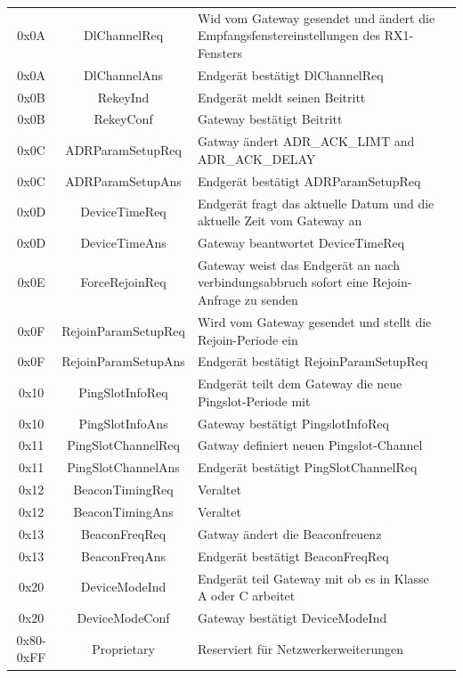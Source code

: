 \documentclass[a4paper, 12pt]{article}
\begin{document}
\begin{longtable}{c |c | p{10.5cm} c}
                    0x0A & DlChannelReq & Wid vom Gateway gesendet und ändert die Empfangsfenstereinstellungen des RX1-Fensters \\
                    0x0A & DlChannelAns & Endgerät bestätigt DlChannelReq \\
                    0x0B & RekeyInd & Endgerät meldt seinen Beitritt \\
                    0x0B & RekeyConf & Gateway bestätigt Beitritt \\
                    0x0C & ADRParamSetupReq & Gatway ändert ADR\_ACK\_LIMT and ADR\_ACK\_DELAY \\
                    0x0C & ADRParamSetupAns & Endgerät bestätigt ADRParamSetupReq \\
                    0x0D & DeviceTimeReq & Endgerät fragt das aktuelle Datum und die aktuelle Zeit vom Gateway an \\
                    0x0D & DeviceTimeAns & Gateway beantwortet DeviceTimeReq \\
                    0x0E & ForceRejoinReq & Gateway weist das Endgerät an nach verbindungsabbruch sofort eine Rejoin-Anfrage zu senden \\
                    0x0F & RejoinParamSetupReq & Wird vom Gateway gesendet und stellt die Rejoin-Periode ein \\
                    0x0F & RejoinParamSetupAns & Endgerät bestätigt RejoinParamSetupReq \\
                    0x10 & PingSlotInfoReq & Endgerät teilt dem Gateway die neue Pingslot-Periode mit \\
                    0x10 & PingSlotInfoAns & Gateway bestätigt PingslotInfoReq \\
                    0x11 & PingSlotChannelReq & Gatway definiert neuen Pingslot-Channel \\
                    0x11 & PingSlotChannelAns & Endgerät bestätigt PingSlotChannelReq \\
                    0x12 & BeaconTimingReq & Veraltet \\
                    0x12 & BeaconTimingAns & Veraltet \\
                    0x13 & BeaconFreqReq & Gatway ändert die Beaconfreuenz \\
                    0x13 & BeaconFreqAns & Endgerät bestätigt BeaconFreqReq\\
                    0x20 & DeviceModeInd & Endgerät teil Gateway mit ob es in Klasse A oder C arbeitet \\
                    0x20 & DeviceModeConf & Gateway bestätigt DeviceModeInd \\
                    0x80-0xFF & Proprietary & Reserviert für Netzwerkerweiterungen \\
                    
                    
                \end{longtable}
                
\end{document}
